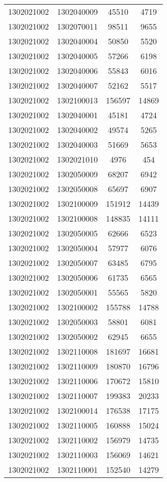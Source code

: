 \begin{longtable}[h]{llcc}
		1302021002 & 1302040009 & 45510 & 4719\\
		1302021002 & 1302070011 & 98511 & 9655\\
		1302021002 & 1302040004 & 50850 & 5520\\
		1302021002 & 1302040005 & 57266 & 6198\\
		1302021002 & 1302040006 & 55843 & 6016\\
		1302021002 & 1302040007 & 52162 & 5517\\
		1302021002 & 1302100013 & 156597 & 14869\\
		1302021002 & 1302040001 & 45181 & 4724\\
		1302021002 & 1302040002 & 49574 & 5265\\
		1302021002 & 1302040003 & 51669 & 5653\\
		1302021002 & 1302021010 & 4976 & 454\\
		1302021002 & 1302050009 & 68207 & 6942\\
		1302021002 & 1302050008 & 65697 & 6907\\
		1302021002 & 1302100009 & 151912 & 14439\\
		1302021002 & 1302100008 & 148835 & 14111\\
		1302021002 & 1302050005 & 62666 & 6523\\
		1302021002 & 1302050004 & 57977 & 6076\\
		1302021002 & 1302050007 & 63485 & 6795\\
		1302021002 & 1302050006 & 61735 & 6565\\
		1302021002 & 1302050001 & 55565 & 5820\\
		1302021002 & 1302100002 & 155788 & 14788\\
		1302021002 & 1302050003 & 58801 & 6081\\
		1302021002 & 1302050002 & 62945 & 6655\\
		1302021002 & 1302110008 & 181697 & 16681\\
		1302021002 & 1302110009 & 180870 & 16796\\
		1302021002 & 1302110006 & 170672 & 15810\\
		1302021002 & 1302110007 & 199383 & 20233\\
		1302021002 & 1302100014 & 176538 & 17175\\
		1302021002 & 1302110005 & 160888 & 15024\\
		1302021002 & 1302110002 & 156979 & 14735\\
		1302021002 & 1302110003 & 156069 & 14621\\
		1302021002 & 1302110001 & 152540 & 14279\\

\end{longtable}

